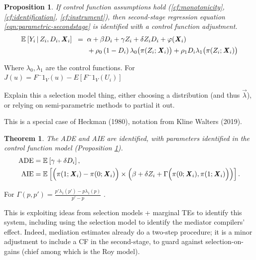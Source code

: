 \newtheorem{proposition}{Proposition}
\begin{proposition}
    \label{proposition:secondstage}
    If control function assumptions hold (\ref{cf:monotonicity}, \ref{cf:identification}, \ref{cf:instrument}), then second-stage regression equation \eqref{eqn:parametric-secondstage} is identified with a control function adjustment.
    \begin{align*}
        \mathbb{E}_{} \left[ Y_i \, \middle\vert \, Z_i, D_i, \boldsymbol{\mathit{X}}_i \right] \;\; =& \;\;
            \alpha
            + \beta D_i
            + \gamma Z_i
            + \delta Z_i D_i
            + \varphi(\boldsymbol{\mathit{X}}_i) \\
            & \;\; +  \rho_0 \left( 1 - D_i \right) \lambda_0 \big( \pi(Z_i ; \boldsymbol{\mathit{X}}_i) \big)
                + \rho_1 D_i \lambda_1 \big( \pi(Z_i ; \boldsymbol{\mathit{X}}_i) \big)
    \end{align*}
\end{proposition}

Where $\lambda_0, \lambda_1$ are the control functions.
For $J(u) = F^-1_V(u) - E[ F^-1_V(U_i) ]$

Explain this a selection model thing, either choosing a distribution (and thus $\vec\lambda$), or relying on semi-parametric methods to partial it out.

This is a special case of Heckman (1980), notation from Kline Walters (2019).

\newtheorem{theoremCF}{Theorem}
\renewcommand\thetheoremCF{CF}
\begin{theoremCF}
    \label{thm:cf-identification}
    The ADE and AIE are identified, with parameters identified in the control function model (Proposition \ref{proposition:secondstage}).
    \begin{align*}
    \text{ADE}
        &= \mathbb{E}_{} \left[ \gamma + \delta D_i \right], \\
    \text{AIE}
        &= \mathbb{E}_{} \left[  \Big(\pi(1; \boldsymbol{\mathit{X}}_i) - \pi(0; \boldsymbol{\mathit{X}}_i) \Big) \times
            \left( \beta +  \delta Z_i +
                \Gamma \Big(\pi(0; \boldsymbol{\mathit{X}}_i), \pi(1; \boldsymbol{\mathit{X}}_i) \Big)\right) \right].
    \end{align*}
\end{theoremCF}
For $\Gamma\left(p,p'\right) = \frac{p'\lambda_1\left(p'\right) - p\lambda_1\left(p\right)}{p' - p}$ \citep{kline2019heckits}.

This is exploiting ideas from selection models + marginal TEs to identify this system, including using the selection model to identify the mediator compilers’ effect.
Indeed, mediation estimates already do a two-step procedure; it is a minor adjustment to include a CF  in the second-stage, to guard against selection-on-gains (chief among which is the Roy model).

